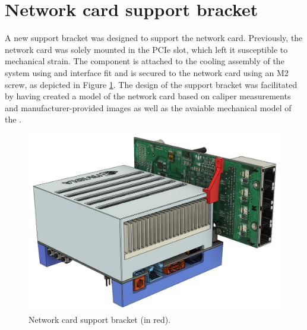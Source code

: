 \section{Network card support bracket}
A new support bracket was designed to support the network card.
Previously, the network card was solely mounted in the PCIe slot, which left it susceptible to mechanical strain.
The component is attached to the cooling assembly of the \jx system using and interface fit and is secured to the network card using an M2 screw, as depicted in Figure \ref{fig:network_card_support}.
The design of the support bracket was facilitated by having created a model of the network card based on caliper measurements and manufacturer-provided images as well as the avaiable mechanical model of the \jx \cite{mucahittoygarNVIDIAJetsonAGX2019}.


\begin{figure}[H]
    \centering
    \includegraphics[width=.6\textwidth]{figures/3d_print/support.jpg}
    \caption{Network card support bracket (in red).}
    \label{fig:network_card_support}
\end{figure}
